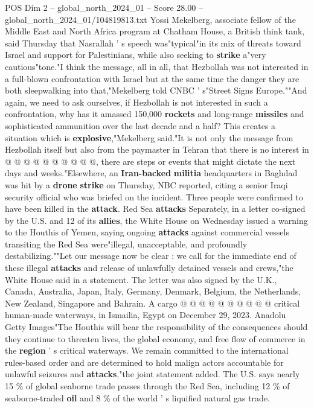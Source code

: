 \begin{textsample}{POS Dim 2 – global\_north\_2024\_01 – Score 28.00 – global\_north\_2024\_01/104819813.txt}
Yossi Mekelberg, associate fellow of the Middle East and North Africa program at Chatham House, a British think tank, said Thursday that Nasrallah ' s speech was"typical"in its mix of threats toward Israel and support for Palestinians, while also seeking to \textbf{strike} a"very cautious"tone."I think the message, all in all, that Hezbollah was not interested in a full-blown confrontation with Israel but at the same time the danger they are both sleepwalking into that,"Mekelberg told CNBC ' s"Street Signs Europe.""And again, we need to ask ourselves, if Hezbollah is not interested in such a confrontation, why has it amassed 150,000 \textbf{rockets} and long-range \textbf{missiles} and sophisticated ammunition over the last decade and a half?
This creates a situation which is \textbf{explosive},"Mekelberg said."It is not only the message from Hezbollah itself but also from the paymaster in Tehran that there is no interest in @ @ @ @ @ @ @ @ @ @, there are steps or events that might dictate the next days and weeks."Elsewhere, an \textbf{Iran-backed} \textbf{militia} headquarters in Baghdad was hit by a \textbf{drone} \textbf{strike} on Thursday, NBC reported, citing a senior Iraqi security official who was briefed on the incident.
Three people were confirmed to have been killed in the \textbf{attack}.
Red Sea \textbf{attacks} Separately, in a letter co-signed by the U.S. and 12 of its \textbf{allies}, the White House on Wednesday issued a warning to the Houthis of Yemen, saying ongoing \textbf{attacks} against commercial vessels transiting the Red Sea were"illegal, unacceptable, and profoundly destabilizing.""Let our message now be clear : we call for the immediate end of these illegal \textbf{attacks} and release of unlawfully detained vessels and crews,"the White House said in a statement.
The letter was also signed by the U.K., Canada, Australia, Japan, Italy, Germany, Denmark, Belgium, the Netherlands, New Zealand, Singapore and Bahrain.
A cargo @ @ @ @ @ @ @ @ @ @ critical human-made waterways, in Ismailia, Egypt on December 29, 2023.
Anadolu Getty Images"The Houthis will bear the responsibility of the consequences should they continue to threaten lives, the global economy, and free flow of commerce in the \textbf{region} ' s critical waterways.
We remain committed to the international rules-based order and are determined to hold malign actors accountable for unlawful seizures and \textbf{attacks},"the joint statement added.
The U.S. says nearly 15 \% of global seaborne trade passes through the Red Sea, including 12 \% of seaborne-traded \textbf{oil} and 8 \% of the world ' s liquified natural gas trade.

\end{textsample}
